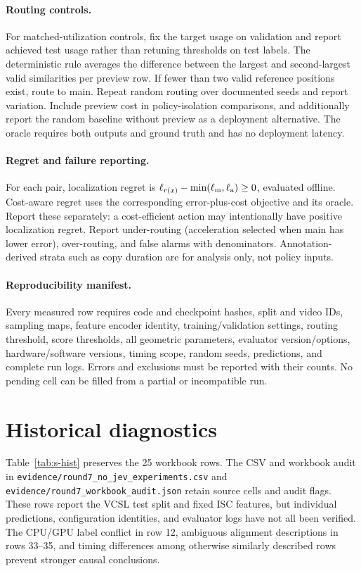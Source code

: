 \documentclass[10pt,twocolumn,letterpaper]{article}
\begin{document}
\paragraph{Routing controls.}
For matched-utilization controls, fix the target usage on validation and report achieved test
usage rather than retuning thresholds on test labels. The deterministic rule averages
the difference between the largest and second-largest valid similarities per preview row.
If fewer than two valid reference positions exist, route to main. Repeat random routing
over documented seeds and report variation. Include preview cost in policy-isolation
comparisons, and additionally report the random baseline without preview as a deployment
alternative. The oracle requires both outputs and ground truth and has no deployment latency.

\paragraph{Regret and failure reporting.}
For each pair, localization regret is
$\ell_{r(x)}-\min(\ell_{\rm m},\ell_{\rm a})\ge0$, evaluated offline. Cost-aware regret uses
the corresponding error-plus-cost objective and its oracle. Report these separately:
a cost-efficient action may intentionally have positive localization regret. Report
under-routing (acceleration selected when main has lower error), over-routing, and false
alarms with denominators. Annotation-derived strata such as copy duration are for analysis
only, not policy inputs.

\paragraph{Reproducibility manifest.}
Every measured row requires code and checkpoint hashes, split and video IDs, sampling maps,
feature encoder identity, training/validation settings, routing threshold, score thresholds,
all geometric parameters, evaluator version/options, hardware/software versions, timing
scope, random seeds, predictions, and complete run logs. Errors and exclusions must be
reported with their counts. No pending cell can be filled from a partial or incompatible run.

\section{Historical diagnostics}
\label{sec:s-hist}
Table~\ref{tab:s-hist} preserves the 25 workbook rows. The CSV and workbook audit in
\texttt{evidence/round7\_no\_jev\_experiments.csv} and
\texttt{evidence/round7\_workbook\_audit.json} retain source cells and audit flags.
These rows report the VCSL test split and fixed ISC features, but individual predictions,
configuration identities, and evaluator logs have not all been verified. The CPU/GPU
label conflict in row 12, ambiguous alignment descriptions in rows 33--35, and timing
differences among otherwise similarly described rows prevent stronger causal conclusions.
\end{document}
